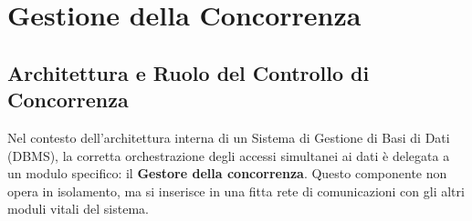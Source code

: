 
\chapter{Gestione della Concorrenza}

\section{Architettura e Ruolo del Controllo di Concorrenza}

Nel contesto dell'architettura interna di un Sistema di Gestione di Basi di Dati (DBMS), la corretta orchestrazione degli accessi simultanei ai dati è delegata a un modulo specifico: il \textbf{Gestore della concorrenza}. Questo componente non opera in isolamento, ma si inserisce in una fitta rete di comunicazioni con gli altri moduli vitali del sistema.


